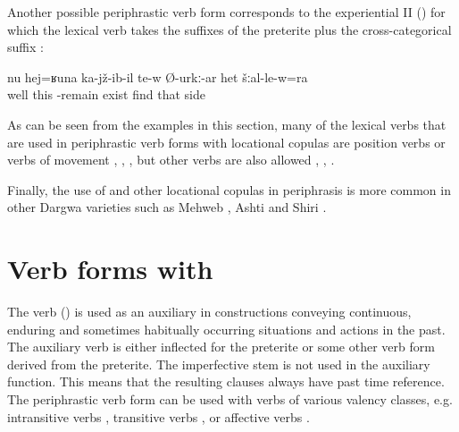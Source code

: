 Another possible periphrastic verb form corresponds to the experiential II () for which the lexical verb takes the suffixes of the preterite plus the cross-categorical suffix :
%
\begin{exe}
	\ex	\label{ex:‎Well, he is like sitting, probably, at the side (of the road)}
	\gll	nu	hej=ʁuna	ka-jž-ib-il	te-w	Ø-urkː-ar	het	šːal-le-w=ra\\
		well	this	-remain	exist	find	that	side\\
	\glt	{}
\end{exe}

As can be seen from the examples in this section, many of the lexical verbs that are used in periphrastic verb forms with locational copulas are position verbs or verbs of movement , , , but other verbs are also allowed , , .

Finally, the use of  and other locational copulas in periphrasis is more common in other Dargwa varieties such as Mehweb \citep{Daniel2015}, Ashti \citep{Belyaev2012} and Shiri \citep{BelyaevInPreparation}.



\section{Verb forms with \protect{} \protect{}}
\label{sec:Verb forms with kelgw- remain}

The verb  ()  is used as an auxiliary in constructions conveying continuous, enduring and sometimes habitually occurring situations and actions in the past. The auxiliary verb is either inflected for the preterite  or some other verb form derived from the preterite. The imperfective stem  is not used in the auxiliary function. This means that the resulting clauses always have  past time reference. The periphrastic verb form can be used with verbs of various valency classes, e.g. intransitive verbs , transitive verbs , or affective verbs . 

